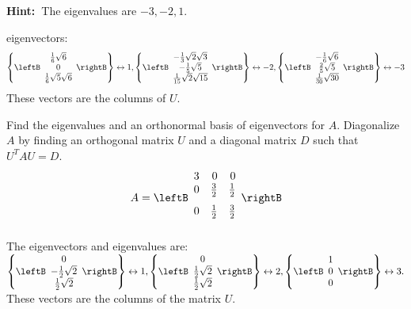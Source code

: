 \begin{enumialphparenastyle}
\begin{ex}
\textbf{Hint:\ }The eigenvalues are $-3,-2,1.$ 
\begin{sol}
eigenvectors:
\[
\left\{ \leftB
\begin{array}{c}
\frac{1}{6}\sqrt{6} \\
0 \\
\frac{1}{6}\sqrt{5}\sqrt{6}
\end{array}
\rightB \right\} \leftrightarrow 1,\left\{ \leftB
\begin{array}{c}
-\frac{1}{3}\sqrt{2}\sqrt{3} \\
-\frac{1}{5}\sqrt{5} \\
\frac{1}{15}\sqrt{2}\sqrt{15}
\end{array}
\rightB \right\} \leftrightarrow -2,\left\{ \leftB
\begin{array}{c}
-\frac{1}{6}\sqrt{6} \\
\frac{2}{5}\sqrt{5} \\
\frac{1}{30}\sqrt{30}
\end{array}
\rightB \right\} \leftrightarrow -3
\]
These vectors are the columns of $U$.
\end{sol}
\end{ex}


\begin{ex} Find the eigenvalues and an orthonormal basis of eigenvectors for $A.$
Diagonalize $A$ by finding an orthogonal matrix $U$ and a diagonal matrix $D$
such that $U^{T}AU=D$.\ 
\begin{equation*}
A=\leftB 
\begin{array}{rrr}
3 & 0 & 0 \\ 
0 & \vspace{0.05in}\frac{3}{2} & \vspace{0.05in}\frac{1}{2} \\ 
0 & \vspace{0.05in}\frac{1}{2} & \vspace{0.05in}\frac{3}{2}
\end{array}
\rightB 
\end{equation*}
\begin{sol}
The eigenvectors and eigenvalues are: $\left\{ \leftB
\begin{array}{c}
0 \\
-\frac{1}{2}\sqrt{2} \\
\frac{1}{2}\sqrt{2}
\end{array}
\rightB \right\} \leftrightarrow 1,\left\{ \leftB
\begin{array}{c}
0 \\
\frac{1}{2}\sqrt{2} \\
\frac{1}{2}\sqrt{2}
\end{array}
\rightB \right\} \leftrightarrow 2,\left\{ \leftB
\begin{array}{c}
1 \\
0 \\
0
\end{array}
\rightB \right\} \leftrightarrow 3.$ These vectors are the columns of the
matrix $U$.
\end{sol}
\end{ex}


\end{enumialphparenastyle}
